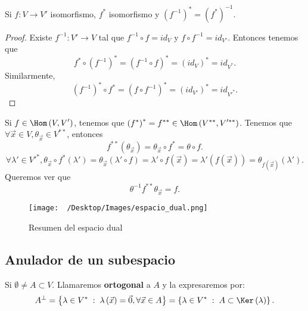 \begin{fprop}[]
\normalfont Si $\displaystyle f: V \to V' $ isomorfismo, $\displaystyle f^{*} $ isomorfismo y $\displaystyle \left(f^{-1}\right)^{*} = \left(f^{*}\right)^{-1} $.
\end{fprop}

\begin{proof}
Existe $\displaystyle f^{-1}: V' \to V $ tal que $\displaystyle f^{-1}\circ f = id _{V} $ y $\displaystyle f \circ f^{-1} = id _{V'} $. Entonces tenemos que 
\[f^{*} \circ \left(f^{-1}\right)^{*} = \left(f^{-1}\circ f\right)^{*} = \left(id _{V}\right)^{*} = id _{V^{*}} .\]
Similarmente, 
\[\left(f^{-1}\right)^{*} \circ f^{*} = \left(f\circ f^{-1}\right)^{*} = \left(id _{V'}\right)^{*} = id _{V'^{*}} .\]
\end{proof}

Si $\displaystyle f \in \Hom\left(V, V'\right) $, tenemos que $\displaystyle \left(f^{*}\right)^{*} = f^{**} \in\Hom\left(V^{**}, V'^{**}\right) $. Tenemos que $\displaystyle \forall \vec{x} \in V, \theta_{\vec{x}}\in V^{**} $, entonces
\[f^{**}\left(\theta_{\vec{x}}\right) = \theta_{\vec{x}} \circ f^{*} = \theta \circ f .\]
\[ \forall \lambda'\in V'^{*}, \theta_{\vec{x}}\circ f^{*}\left(\lambda'\right) = \theta_{\vec{x}}\left(\lambda'\circ f\right) = \lambda'\circ f\left(\vec{x}\right) = \lambda'\left(f\left(\vec{x}\right)\right) = \theta_{f\left(\vec{x}\right)}\left(\lambda'\right) .\]
Queremos ver que 
\[\theta^{-1}f^{**}\theta_{\vec{x}} = f .\]

\begin{figure}
\centering
\texttt{[image: ~/Desktop/Images/espacio\_dual.png]}
\caption{Resumen del espacio dual}
\label{ enter label$}
\end{figure}

\subsection{Anulador de un subespacio}

\begin{fdefinition}
	\normalfont Si $\displaystyle \emptyset \neq A \subset V $. Llamaremos \textbf{ortogonal} a $\displaystyle A $ y la expresaremos por:
	\[ A^{\perp} = \left\{ \lambda \in V^{*} \; : \; \lambda\left(\vec{x}\right) = \vec{0}, \forall\vec{x} \in A\right\} = \left\{ \lambda \in V^{*} \; : \; A \subset \Ker\left(\lambda\right)\right\} .\]
\end{fdefinition}

